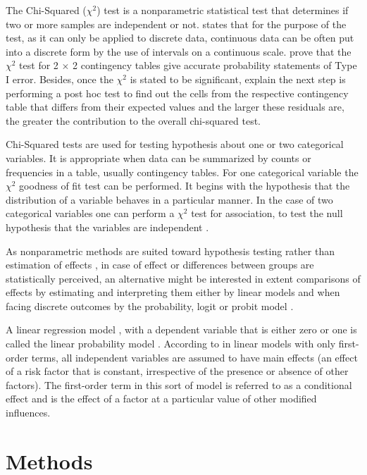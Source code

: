 \documentclass[5p,times]{elsarticle}
\begin{document}
	The Chi-Squared ($\chi^{2}$) test is a nonparametric statistical test that determines if two or more samples are independent or not. \citet{zibran2007chi} states that for the purpose of the test, as it can only be applied to discrete data, continuous data can be often put into a discrete form by the use of intervals on a continuous scale. \citet{camilli1978applicability} prove that the $\chi^{2}$ test for 2 $\times$ 2 contingency tables give accurate probability statements of Type I error. Besides, once the $\chi^{2}$ is stated to be significant, \citet{shan2017fisher} explain the next step is performing a post hoc test to find out the cells from the respective contingency table that differs from their expected values and the larger these residuals are, the greater the contribution to the overall chi-squared test.
	
	Chi-Squared tests are used for testing hypothesis about one or two categorical variables. It is appropriate when data can be summarized by counts or frequencies in a table, usually contingency tables. For one categorical variable the $\chi^{2}$ goodness of fit test can be performed. It begins with the hypothesis that the distribution of a variable behaves in a particular manner. In the case of two categorical variables one can perform a $\chi^{2}$ test for association, to test the null hypothesis that the variables are independent  \cite{charles1997introduction}.
	
	As nonparametric methods are suited toward hypothesis testing rather than estimation of effects \cite{whitley2002statistics}, in case of effect or differences between groups are statistically perceived, an alternative might be interested in extent comparisons of effects by estimating and interpreting them either by linear models and when facing discrete outcomes by the probability, logit or probit model \cite{holm2015comparing}.
	
	A linear regression model \cite{myers1990classical}, with a dependent variable that is either zero or one is called the linear probability model \cite{aldrich1984linear}. According to \cite{cleary1982estimation} in linear models with only first-order terms, all independent variables are assumed to have main effects (an effect of a risk factor that is constant, irrespective of the presence or absence of other factors). The first-order term in this sort of model is referred to as a conditional effect and is the effect of a factor at a particular value of other modified influences.
	
\section{Methods}\label{Section4}
\end{document}
